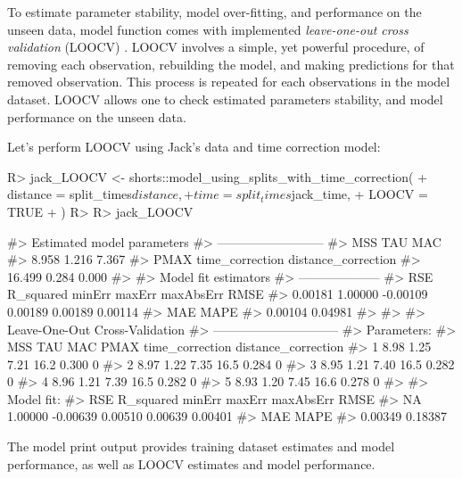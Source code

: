 \documentclass[
]{jss}
\begin{document}
To estimate parameter stability, model over-fitting, and performance on the unseen data,  model function comes with implemented \emph{leave-one-out cross validation} (LOOCV) \citep{jamesIntroductionStatisticalLearning2017, jovanovicBmbstatsBootstrapMagnitudebased2020, kuhnAppliedPredictiveModeling2018}. LOOCV involves a simple, yet powerful procedure, of removing each observation, rebuilding the model, and making predictions for that removed observation. This process is repeated for each observations in the model dataset. LOOCV allows one to check estimated parameters stability, and model performance on the unseen data.

Let's perform LOOCV using Jack's data and time correction model:

\begin{CodeChunk}
\begin{CodeInput}
R> jack_LOOCV <- shorts::model_using_splits_with_time_correction(
+   distance = split_times$distance,
+   time = split_times$jack_time,
+   LOOCV = TRUE
+ )
R> 
R> jack_LOOCV
\end{CodeInput}
\begin{CodeOutput}
#> Estimated model parameters
#> --------------------------
#>                 MSS                 TAU                 MAC 
#>               8.958               1.216               7.367 
#>                PMAX     time_correction distance_correction 
#>              16.499               0.284               0.000 
#> 
#> Model fit estimators
#> --------------------
#>       RSE R_squared    minErr    maxErr maxAbsErr      RMSE 
#>   0.00181   1.00000  -0.00109   0.00189   0.00189   0.00114 
#>       MAE      MAPE 
#>   0.00104   0.04981 
#> 
#> 
#> Leave-One-Out Cross-Validation
#> ------------------------------
#> Parameters:
#>    MSS  TAU  MAC PMAX time_correction distance_correction
#> 1 8.98 1.25 7.21 16.2           0.300                   0
#> 2 8.97 1.22 7.35 16.5           0.284                   0
#> 3 8.95 1.21 7.40 16.5           0.282                   0
#> 4 8.96 1.21 7.39 16.5           0.282                   0
#> 5 8.93 1.20 7.45 16.6           0.278                   0
#> 
#> Model fit:
#>       RSE R_squared    minErr    maxErr maxAbsErr      RMSE 
#>        NA   1.00000  -0.00639   0.00510   0.00639   0.00401 
#>       MAE      MAPE 
#>   0.00349   0.18387
\end{CodeOutput}
\end{CodeChunk}

The model print output provides training dataset estimates and model performance, as well as LOOCV estimates and model performance.
\end{document}
